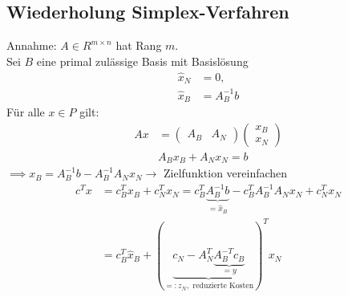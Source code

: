 \subsection{Wiederholung Simplex-Verfahren}
Annahme: $A \in R^{m \times n}$ hat Rang $m$.\\
Sei $B$ eine primal zulässige Basis mit Basislösung 
\begin{align*}
	\hat{x}_{N}&=0,\\
	\hat{x}_{B}&= A_{B}^{-1}b
\end{align*} 
Für alle $x \in P$ gilt:
\begin{align*}
	Ax&=
	\begin{pmatrix}
		A_{B} & A_{N}
	\end{pmatrix}
	\begin{pmatrix}
		x_{B} \\ x_{N}
	\end{pmatrix}
	\\
	  & A_{B}x_{B} + A_{N}x_{N}= b
\end{align*} 
$\implies x_{B} = A_{B}^{-1}b - A_{B}^{-1}A_{N}x_{N} \to$ Zielfunktion vereinfachen
\begin{align*}
	c^Tx&= c_{B}^Tx_{B} + c_{N}^Tx_{N} = c_{B}^T \underbrace{A_{B}^{-1}b}_{= \hat{x}_{B}} - c_{B}^TA_{B}^{-1}A_{N}x_{N} + c_{N}^Tx_{N}\\
		&= c^{T}_{B} \hat{x}_{B} +( \underbrace{ c_{N} - A_{N}^{T} \underbrace{A_{B}^{-T}c_{B}}_{=y} }_{=: z_{N}, \text{ reduzierte Kosten}} )^{T} x_{N} 
\end{align*} 

